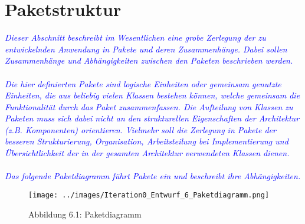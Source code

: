 \section{Paketstruktur}
\textcolor{blue}{\textit{Dieser Abschnitt beschreibt im Wesentlichen eine grobe Zerlegung der zu entwickelnden Anwendung in Pakete und deren Zusammenhänge. Dabei sollen Zusammenhänge und Abhängigkeiten zwischen den Paketen beschrieben werden.\\\\
Die hier definierten Pakete sind logische Einheiten oder gemeinsam genutzte Einheiten, die aus beliebig vielen Klassen bestehen können, welche gemeinsam die Funktionalität durch das Paket zusammenfassen. Die Aufteilung von Klassen zu Paketen muss sich dabei nicht an den strukturellen Eigenschaften der Architektur (z.B. Komponenten) orientieren. Vielmehr soll die Zerlegung in Pakete der besseren Strukturierung, Organisation, Arbeitsteilung bei Implementierung und Übersichtlichkeit der in der gesamten Architektur verwendeten Klassen dienen.\\\\
Das folgende Paketdiagramm führt Pakete ein und beschreibt ihre Abhängigkeiten. 
}}

\begin{figure}[H]
\centering
\texttt{[image: ../images/Iteration0\_Entwurf\_6\_Paketdiagramm.png]}
\caption{Abbildung 6.1: Paketdiagramm}
\label{Paketstruktur}
\end{figure}
